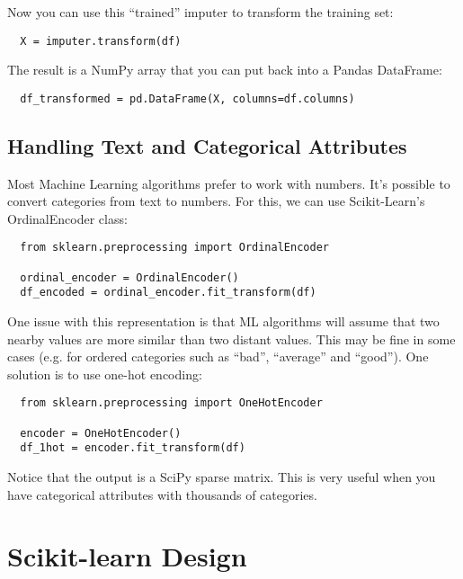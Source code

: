 \documentclass[french]{article}
\begin{document}
Now you can use this ``trained'' imputer to transform the training set:
\begin{lstlisting}
  X = imputer.transform(df)
\end{lstlisting}

The result is a NumPy array that you can put back into a Pandas DataFrame:
\begin{lstlisting}
  df_transformed = pd.DataFrame(X, columns=df.columns)
\end{lstlisting}

\subsection{Handling Text and Categorical Attributes}

Most Machine Learning algorithms prefer to work with numbers. It's possible to convert categories from text to numbers. For this, we can use Scikit-Learn's OrdinalEncoder class:
\begin{lstlisting}
  from sklearn.preprocessing import OrdinalEncoder

  ordinal_encoder = OrdinalEncoder()
  df_encoded = ordinal_encoder.fit_transform(df)
\end{lstlisting}

One issue with this representation is that ML algorithms will assume that two nearby values are more similar than two distant values. This may be fine in some cases (e.g. for ordered categories such as ``bad'', ``average'' and ``good''). One solution is to use one-hot encoding:
\begin{lstlisting}
  from sklearn.preprocessing import OneHotEncoder

  encoder = OneHotEncoder()
  df_1hot = encoder.fit_transform(df)
\end{lstlisting}

Notice that the output is a SciPy sparse matrix. This is very useful when you have categorical attributes with thousands of categories.

\section{Scikit-learn Design}
\end{document}
